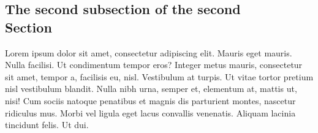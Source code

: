 \documentclass[a4paper,10pt]{article}
\begin{document}
\begin{multicols}{2}
\subsection{The second subsection of the second \\ Section}

Lorem ipsum dolor sit amet, consectetur adipiscing elit. Mauris eget mauris.
Nulla facilisi. Ut condimentum tempor eros? Integer metus mauris, consectetur
sit amet, tempor a, facilisis eu, nisl. Vestibulum at turpis. Ut vitae tortor
pretium nisl vestibulum blandit. Nulla nibh urna, semper et, elementum at,
mattis ut, nisi! Cum sociis natoque penatibus et magnis dis parturient montes,
nascetur ridiculus mus. Morbi vel ligula eget lacus convallis venenatis. Aliquam
lacinia tincidunt felis. Ut dui.




\end{multicols}
\end{document}
